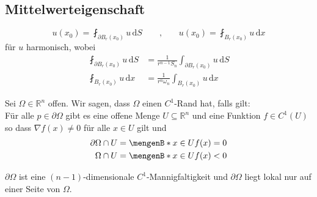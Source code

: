 \subsection{Mittelwerteigenschaft} 
\label{sub:mittelwerteigenschaft}
\begin{equation}
	u(x_0) = \fint_{\partial B_r(x_0)}^{} u \,\mathrm{d}S \qquad  \text{,} \qquad u(x_0) = \fint_{B_r(x_0)}^{} u \,\mathrm{d}x
\end{equation}
für $u$ harmonisch, wobei 
\begin{align*}
	\fint_{\partial B_r(x_0)}^{} u \,\mathrm{d}S &= \frac{1}{r^{n-1}S_n} \int_{\partial B_r(x_0)}^{}  u\,\mathrm{d}S \\
	\fint_{B_r(x_0)}^{} u \,\mathrm{d}x &= \frac{1}{r^n \omega_n} \int_{B_r(x_0)}^{}u \,\mathrm{d}x
\end{align*}

\begin{definition*}[$C^1$-Rand]
	Sei $\Omega \in \mathbb{R}^n$ offen. Wir sagen, dass $\Omega$ einen $C^1$-Rand hat, falls gilt: \\
	Für alle $p \in \partial \Omega$ gibt es eine offene Menge $U \subseteq \mathbb{R}^n$ und eine Funktion $f \in C^1(U)$ so dass $ \nabla f(x) \neq 0$ für alle $x \in U$ gilt und
	\begin{align*}
		\partial \Omega \cap U &= \set[x \in U]{f(x)=0} \\
		\Omega \cap U &= \set[x \in U]{f(x) < 0}
	\end{align*}
\end{definition*}

\begin{bemerkung}
	$\partial \Omega$ ist eine $(n-1)$-dimensionale $C^1$-Mannigfaltigkeit und $\partial \Omega$ liegt lokal nur auf einer Seite von $\Omega$.
\end{bemerkung}

